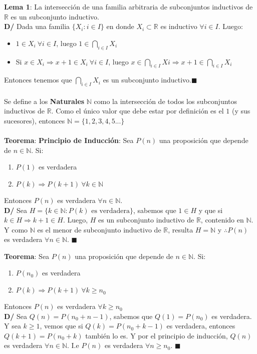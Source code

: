 \documentclass[11pt,a4paper]{article}
\newcommand*{\QEDA}{\null\nobreak\hfill\ensuremath{\blacksquare}}
\begin{document}
\noindent \textbf{Lema 1}: La intersecci\'on de una familia arbitraria de subconjuntos inductivos de $\mathbb{R}$ es un subconjunto inductivo.\\ 
\textbf{D/} Dada una familia $\{ X_i : i \in I \}$ en donde $X_i \subset \mathbb{R}$ es inductivo $\forall i \in I$. Luego:

\begin{itemize}
\item $1 \in X_i\ \forall i \in I$, luego $1 \in \displaystyle{\bigcap_{i \in I}} X_i$
\item Si $x \in X_i \Rightarrow x+1 \in X_i\ \forall i \in I$, luego $x \in \displaystyle{\bigcap_{i \in I} Xi} \Rightarrow x + 1 \in \displaystyle{\bigcap_{i \in I}} X_i$
\end{itemize}
Entonces tenemos que $\displaystyle{\bigcap_{i \in I} X_i}$ es un subconjunto inductivo.\QEDA\\ \\

\noindent Se define a los \textbf{Naturales} $\mathbb{N}$ como la intersecci\'on de todos los subconjuntos inductivos de $\mathbb{R}$. Como el \'unico valor que debe estar por definici\'on es el $1$ (y sus sucesores), entonces $\mathbb{N} = \{ 1,2,3,4,5... \}$\\ \\


\noindent \textbf{Teorema}: \textbf{Principio de Inducci\'on}: Sea $P(n)$ una proposici\'on que depende de $n \in \mathbb{N}$. Si:
\begin{enumerate}
\item $P(1)$ es verdadera
\item $P(k) \Rightarrow P(k+1)\ \forall k \in \mathbb{N}$ 
\end{enumerate}
\indent \indent Entonces $P(n)$ es verdadera $\forall n \in \mathbb{N}$.\\
\noindent \textbf{D/} Sea $H = \{ k \in \mathbb{N} : P(k) \text{ es verdadera} \}$, sabemos que $1 \in H$ y que si $k \in H \Rightarrow k+1 \in H$. Luego, $H$ es un subconjunto inductivo de $\mathbb{R}$, contenido en $\mathbb{N}$. Y como $\mathbb{N}$ es el menor de subconjunto inductivo de $\mathbb{R}$, resulta $H = \mathbb{N}$ y $\therefore P(n)$ es verdadera $\forall n \in \mathbb{N}$. \QEDA

\newpage

\noindent \textbf{Teorema}: Sea $P(n)$ una proposici\'on que depende de $n \in \mathbb{N}$. Si:
\begin{enumerate}
\item $P(n_0)$ es verdadera
\item $P(k) \Rightarrow P(k+1)\ \forall k \geq n_0$
\end{enumerate}
Entonces $P(n)$ es verdadera $\forall k \geq n_0$\\
\textbf{D/} Sea $Q(n) = P(n_0 + n - 1)$, sabemos que $Q(1) = P(n_0)$ es verdadera. Y sea $k \geq 1$, vemos que si $Q(k) = P(n_0 + k - 1)$ es verdadera, entonces $Q(k+1) = P(n_0 + k)$ tambi\'en lo es. Y por el principio de inducci\'on, $Q(n)$ es verdadera $\forall n \in \mathbb{N}$. I.e $P(n)$ es verdadera $\forall n \geq n_0$. \QEDA\\
\end{document}
